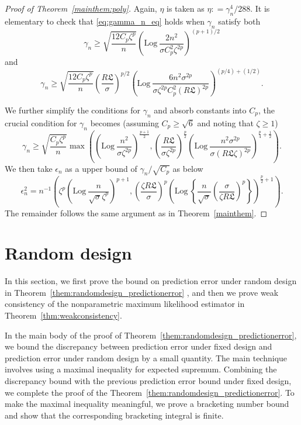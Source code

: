 \documentclass[11pt]{article}
\numberwithin{equation}{section}
\newcommand{\lipsz}{\mathfrak{L}}
\newcommand{\Log}{\mathrm{Log}~}
\begin{document}
\begin{appendices}
\begin{proof}[Proof of Theorem~\ref{mainthem:poly}]
Again, $\eta$ is taken as $\eta: = \gamma_n^4/288$. It is elementary to check that \eqref{eq:gamma_n_eq} holds 
when $\gamma_n$ satisfy both
\begin{equation*}
  \gamma_n \geq \sqrt{\frac{12C_p\zeta^p}{n}} \left(\Log  \frac{2n^2}{\sigma C_p^2\zeta^{2p}} \right)^{(p+1)/2} 
\end{equation*}
and
\begin{equation*}
  \gamma_n \geq \sqrt{\frac{12 C_p \zeta^p }{n}} \left(\frac{R \lipsz}{\sigma} \right)^{p/2} \left(\Log \frac{6n^2 \sigma^{2p}}{\sigma \zeta^{2p} C_p^2 (R \lipsz)^{2p}} \right)^{(p/4) + (1/2)} .
\end{equation*}


We further simplify the conditions for $\gamma_n$ and absorb constants into $C_p$, the crucial condition for $\gamma_n$ becomes (assuming $C_p \geq \sqrt{6}$ and noting that $\zeta\geq 1$)
\[
\gamma_n \geq \sqrt{\frac{C_p \zeta^p }{n}} \max \left(\left(\Log  \frac{n^2}{\sigma\zeta^{2p}} \right)^{\frac{p+1}{2}} , \left(\frac{R \lipsz}{\sigma \zeta^{2p}} \right)^{\frac{p}{2}} \left(\Log \frac{n^2 \sigma^{2p}}{\sigma (R \lipsz \zeta)^{2p}} \right)^{\frac{p}{4} + \frac{1}{2}}  \right).
\]
We then take $\epsilon_n$ as a upper bound of $\gamma_n/\sqrt{C_p}$ as below
\[
\epsilon^2_n =n^{-1} \left(\zeta^p\left(\Log  \frac{n}{\sqrt{\sigma}\zeta^p} \right)^{p+1} , \left(\frac{\zeta R \lipsz}{\sigma} \right)^p \left(\Log \left\{\frac{n}{\sqrt{\sigma}} \left(\frac{\sigma}{\zeta R \lipsz} \right)^p \right\} \right)^{\frac{p}{2} + 1}  \right).
\]
The remainder follows the same argument as in Theorem~\ref{mainthem}.
\end{proof}

\section{Random design}

In this section, we first prove the bound on prediction error under random design in Theorem~\ref{them:randomdesign_predictionerror} , and then we prove weak consistency of the nonparametric maximum likelihood estimator in Theorem~\ref{thm:weakconsistency}.

In the main body of the proof of Theorem~\ref{them:randomdesign_predictionerror}, we bound the discrepancy between prediction error under fixed design and prediction error under random design by a small quantity. The main technique involves using a maximal inequality for expected supremum. Combining the discrepancy bound with the previous prediction error bound under fixed design, we complete the proof of the Theorem~\ref{them:randomdesign_predictionerror}. To make the maximal inequality meaningful, we prove a bracketing number bound and show that the corresponding bracketing integral is finite.


\end{appendices}
\end{document}
